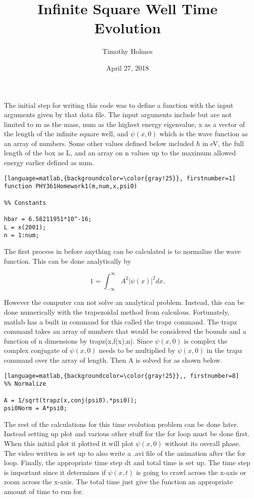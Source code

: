 \documentclass{article}
\title{Infinite Square Well Time Evolution}
\author{Timothy Holmes}
\date{April 27, 2018}
\begin{document}
\maketitle

The initial step for writing this code was to define a function with the input arguments given by that data file. The input arguments include but are not limited to m as the mass, num as the highest energy eigenvalue, x as a vector of the length of the infinite square well, and $\psi(x,0)$ which is the wave function as an array of numbers. Some other values defined below included $\hbar$ in eV, the full length of the box as L, and an array on n values up to the maximum allowed energy earlier defined as num. 

\begin{lstlisting}[language=matlab,{backgroundcolor=\color{gray!25}}, firstnumber=1]
function PHY361Homework1(m,num,x,psi0)

%% Constants

hbar = 6.58211951*10^-16;
L = x(2001);
n = 1:num;

\end{lstlisting}

The first process in before anything can be calculated is to normalize the wave function. This can be done analytically by

$$
1 = \int_{-\infty}^{\infty} A^{2}|\psi(x)|^{2} dx.
$$

However the computer can not solve an analytical problem. Instead, this can be done numerically with the trapezoidal method from calculous. Fortunately, matlab has a built in command for this called the trapz command. The trapz command takes an array of numbers that would be considered the bounds and a function of n dimensions by trapz(x,f(x),n). Since $\psi(x,0)$ is complex the complex conjugate of $\psi(x,0)$ needs to be multiplied by $\psi(x,0)$ in the trapz command over the array of length. Then A is solved for as shown below. 


\begin{lstlisting}[language=matlab,{backgroundcolor=\color{gray!25}},, firstnumber=8]
%% Normalize

A = 1/sqrt(trapz(x,conj(psi0).*psi0));
psi0Norm = A*psi0;

\end{lstlisting}

The rest of the calculations for this time evolution problem can be done later. Instead setting up plot and various other stuff for the for loop must be done first. When this initial plot it plotted it will plot $\psi(x,0)$ without its overall phase. The video written is set up to also write a .avi file of the animation after the for loop. Finally, the appropriate time step dt and total time is set up. The time step is important since it determines if $\psi(x,t)$ is going to crawl across the x-axis or zoom across the x-axis. The total time just give the function an appropriate amount of time to run for.
\end{document}
